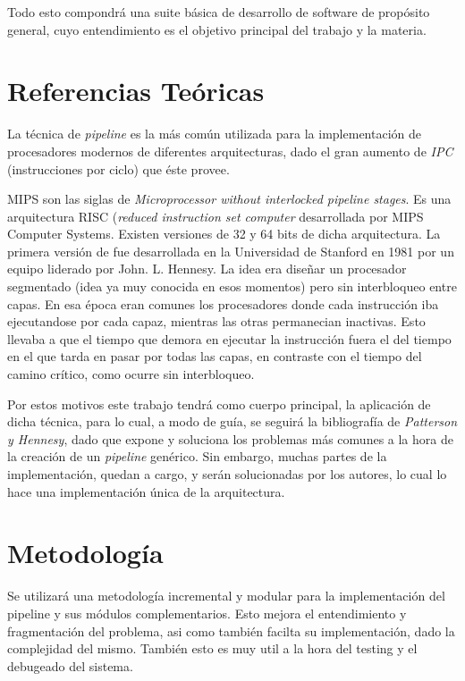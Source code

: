 \documentclass[12pt]{article}
\begin{document}
Todo esto compondrá una suite básica de desarrollo de software de propósito general, cuyo entendimiento es el objetivo principal del trabajo y la materia.


\section{Referencias Teóricas} \label{sec:firstpage}

La técnica de \textit{pipeline} es la más común utilizada para la implementación de procesadores modernos de diferentes arquitecturas, dado el gran aumento de \textit{IPC} (instrucciones por ciclo) que éste provee.

MIPS son las siglas de \textit{Microprocessor without interlocked pipeline stages}. Es una arquitectura RISC (\textit{reduced instruction set computer} desarrollada por MIPS Computer Systems. Existen versiones de 32 y 64 bits de dicha arquitectura. La primera versión de fue desarrollada en la Universidad de Stanford en 1981 por un equipo liderado por John. L. Hennesy. La idea era diseñar un procesador segmentado (idea ya muy conocida en esos momentos) pero sin interbloqueo entre capas. En esa época eran comunes los procesadores donde cada instrucción iba ejecutandose por cada capaz, mientras las otras permanecian inactivas. Esto llevaba a que el tiempo que demora en ejecutar la instrucción fuera el del tiempo en el que tarda en pasar por todas las capas, en contraste con el tiempo del camino crítico, como ocurre sin interbloqueo.

Por estos motivos este trabajo tendrá como cuerpo principal, la aplicación de dicha técnica, para lo cual, a modo de guía, se seguirá la bibliografía de \textit{Patterson y Hennesy}, dado que expone y soluciona los problemas más comunes a la hora de la creación de un \textit{pipeline} genérico. Sin embargo, muchas partes de la implementación, quedan a cargo, y serán solucionadas por los autores, lo cual lo hace una implementación única de la arquitectura.

\section{Metodología}

Se utilizará una metodología incremental y modular para la implementación del pipeline y sus módulos complementarios. Esto mejora el entendimiento y fragmentación del problema, asi como también facilta su implementación, dado la complejidad del mismo. También esto es muy util a la hora del testing y el debugeado del sistema.
\end{document}
